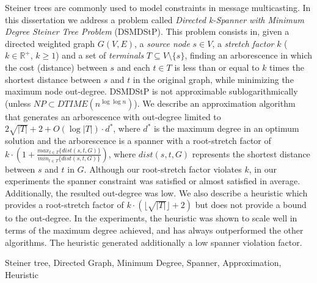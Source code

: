 \abstract
Steiner trees are commonly used to model constraints in message multicasting. 
In this dissertation we address a problem called \emph{Directed k-Spanner with Minimum Degree Steiner Tree Problem} (DSMDStP). This problem
consists in, given a directed weighted graph $G(V,E)$, a \emph{source node} $s \in V$, 
a \emph{stretch factor} $k$ ($k \in \mathbb{R}^+$, $k \ge 1$) and a set of \emph{terminals} $T \subseteq V \setminus \lbrace s \rbrace$, 
finding an arborescence in which the cost (distance) between $s$ and each $t \in T$ 
is less than or equal to $k$ times the shortest distance between $s$ and $t$ in the original graph, 
while minimizing the maximum node out-degree. 
DSMDStP is not approximable sublogarithmically (unless $NP \subset DTIME(n^{\log \log{n}})$).
We describe an approximation algorithm that generates 
an arborescence with out-degree limited to $2\sqrt{|T|} + 2 + O(\log |T|) \cdot d^*$, where $d^*$ is the maximum degree in an optimum solution and 
the arborescence is a spanner with a root-stretch factor of 
$k \cdot \left(1 + \frac{max_{t\in T}\{dist(s,t,G)\}}{min_{t \in T}\{dist(s,t,G)\}}\right)$, 
where $dist(s,t,G)$ represents the shortest distance between $s$ and $t$ in $G$. 
Although our root-stretch factor violates $k$, in our experiments the spanner constraint was satisfied or almost satisfied in average. 
Additionally, the resulted out-degree was low.
We also describe a heuristic which provides a root-stretch factor of $k \cdot (\lfloor\sqrt{|T|}\rfloor+2)$ but does
not provide a bound to the out-degree.
In the experiments, the heuristic was shown to scale well in terms of the maximum degree achieved, and has always outperformed the other algorithms. The heuristic generated additionally a low spanner violation factor.
\begin{keywords}
Steiner tree, Directed Graph, Minimum Degree, Spanner, Approximation, Heuristic
\end{keywords}

